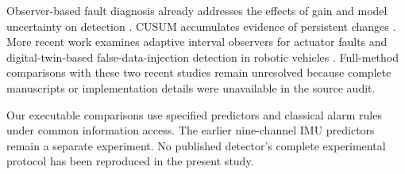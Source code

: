 Observer-based fault diagnosis already addresses the effects of gain and model uncertainty on detection \cite{meseguer}. CUSUM accumulates evidence of persistent changes \cite{nist}. More recent work examines adaptive interval observers for actuator faults \cite{rapio} and digital-twin-based false-data-injection detection in robotic vehicles \cite{kaisar}. Full-method comparisons with these two recent studies remain unresolved because complete manuscripts or implementation details were unavailable in the source audit.

Our executable comparisons use specified predictors and classical alarm rules under common information access. The earlier nine-channel IMU predictors remain a separate experiment. No published detector's complete experimental protocol has been reproduced in the present study.
